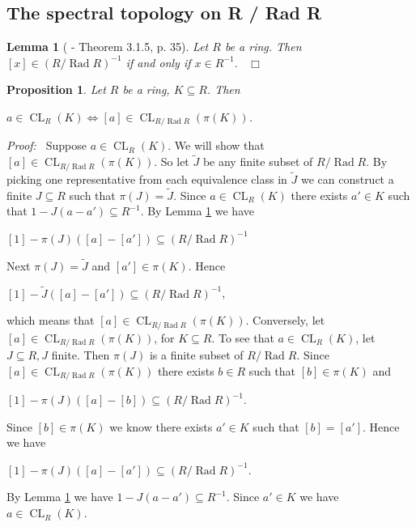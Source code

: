 \documentclass[12pt, oneside]{book}
\newtheorem{lemma}[theorem]{Lemma}
\newtheorem{proposition}[theorem]{Proposition}
\newcommand{\proof}{{\noindent \it Proof:~}}
\newcommand{\qed}{\hfill ~$\Box$\\}
\def\Rad{\operatorname{Rad}}
\def\CL{\operatorname{CL}}
\begin{document}
\subsection{The spectral topology on R / Rad R}
\begin{lemma}[\cite{A} - Theorem 3.1.5, p. 35] \label{InvertsInQuotient}
\normalfont
\noindent Let $R$ be a ring. Then $[x] \in (R/ \Rad R)^{-1}$ if and only if $ x \in R^{-1}$.
\qed
\end{lemma}
\begin{proposition} \label{aInClosureIffEqAInClosure}
\normalfont
\noindent Let $R$ be a ring, $K \subseteq R$. Then
\begin{center}
$a \in \CL_R(K) \iff [a] \in \CL_{R/\Rad R}(\pi(K))$.
\end{center}
\end{proposition}
\proof \space 
\noindent Suppose $a \in \CL_R(K)$. We will show that $[a] \in \CL_{R/\Rad R}(\pi(K))$. 
So let $\tilde{J}$ be any finite subset of $R/\Rad R$. 
By picking one representative from each equivalence class in $\tilde{J}$ we can construct a finite 
$J \subseteq R$ such that $\pi(J) = \tilde{J}$. 
Since $a \in \CL_R(K)$ there exists $a' \in K$ such that 
$1 - J(a - a') \subseteq R^{-1}$. By Lemma \ref{InvertsInQuotient} we have
\begin{center}
$[1] - \pi(J)([a] - [a']) \subseteq (R / \Rad R)^{-1}$
\end{center}
Next $\pi(J) = \tilde{J}$ and $[a'] \in \pi(K)$. Hence
\begin{center}
$[1] - \tilde{J}([a] - [a']) \subseteq (R / \Rad R)^{-1}$,
\end{center}
which means that $[a] \in \CL_{R / \Rad R}(\pi(K))$.
\vskip 0.3cm
\noindent Conversely, let $[a] \in \CL_{R / \Rad R}(\pi(K))$, for $K \subseteq R$. To see that 
$a \in \CL_R(K)$, let $J \subseteq R, J$ finite. Then $\pi(J)$ is a finite subset of $R / \Rad R$.
Since $[a] \in \CL_{R / \Rad R}(\pi(K))$ there exists $b \in R$ such that $[b] \in \pi(K)$ and 
\begin{center}
$[1] - \pi(J)([a] - [b]) \subseteq (R / \Rad R)^{-1}$.
\end{center}
\noindent Since $[b] \in \pi(K)$ we know there exists $a' \in K$ such that $[b] = [a']$. 
Hence we have 
\begin{center}
$[1] - \pi(J)([a] - [a']) \subseteq (R / \Rad R)^{-1}$.
\end{center} 
\noindent By Lemma \ref{InvertsInQuotient} we have $1 - J(a - a') \subseteq R^{-1}$. Since $a' \in K$ 
we have $a \in \CL_R(K)$.
\end{document}
